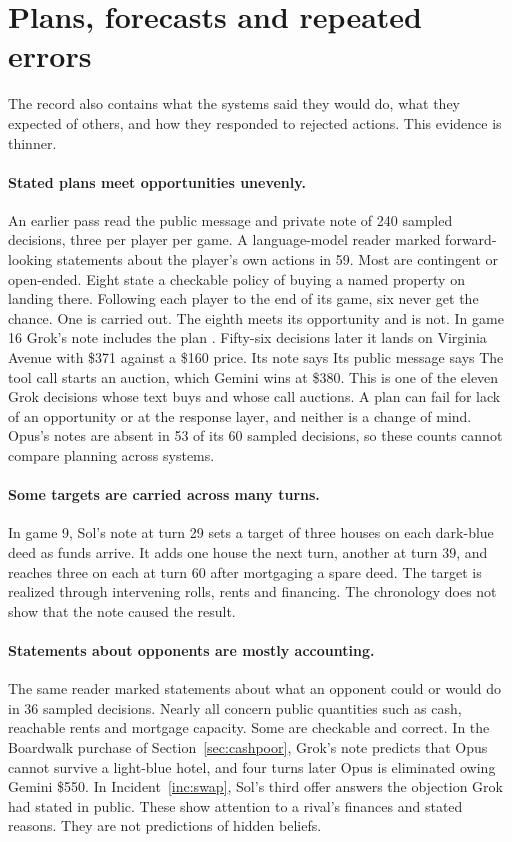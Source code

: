 \section{Plans, forecasts and repeated errors}
\label{sec:temporal}

The record also contains what the systems said they would do, what they expected of others, and how they responded to rejected actions. This evidence is thinner.

\paragraph{Stated plans meet opportunities unevenly.} An earlier pass read the public message and private note of 240 sampled decisions, three per player per game. A language-model reader marked forward-looking statements about the player's own actions in 59. Most are contingent or open-ended. Eight state a checkable policy of buying a named property on landing there. Following each player to the end of its game, six never get the chance. One is carried out. The eighth meets its opportunity and is not. In game 16 Grok's note includes the plan . Fifty-six decisions later it lands on Virginia Avenue with \$371 against a \$160 price. Its note says  Its public message says  The tool call starts an auction, which Gemini wins at \$380. This is one of the eleven Grok decisions whose text buys and whose call auctions. A plan can fail for lack of an opportunity or at the response layer, and neither is a change of mind. Opus's notes are absent in 53 of its 60 sampled decisions, so these counts cannot compare planning across systems.

\paragraph{Some targets are carried across many turns.} In game 9, Sol's note at turn 29 sets a target of three houses on each dark-blue deed as funds arrive. It adds one house the next turn, another at turn 39, and reaches three on each at turn 60 after mortgaging a spare deed. The target is realized through intervening rolls, rents and financing. The chronology does not show that the note caused the result.

\paragraph{Statements about opponents are mostly accounting.} The same reader marked statements about what an opponent could or would do in 36 sampled decisions. Nearly all concern public quantities such as cash, reachable rents and mortgage capacity. Some are checkable and correct. In the Boardwalk purchase of Section~\ref{sec:cashpoor}, Grok's note predicts that Opus cannot survive a light-blue hotel, and four turns later Opus is eliminated owing Gemini \$550. In Incident~\ref{inc:swap}, Sol's third offer answers the objection Grok had stated in public. These show attention to a rival's finances and stated reasons. They are not predictions of hidden beliefs.

